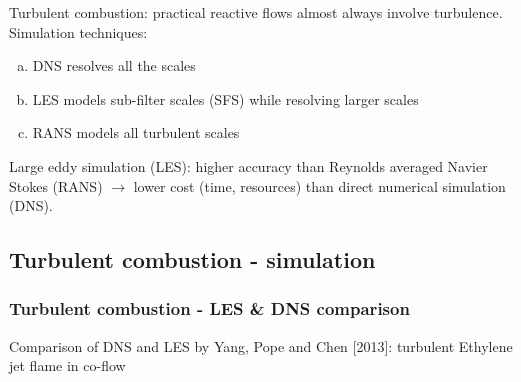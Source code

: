 \documentclass{beamer}
\begin{document}
\begin{frame}
\vspace{10pt}
\scriptsize
Turbulent combustion: practical reactive flows almost always involve turbulence.
\newline \newline
Simulation techniques: 
\begin{enumerate}[(a)]
\item DNS resolves all the scales 
\item LES models sub-filter scales (SFS) while resolving larger scales 
\item RANS models all turbulent scales 
\end{enumerate}
Large eddy simulation (LES): higher accuracy than Reynolds averaged Navier Stokes (RANS) $\rightarrow$ lower cost (time, resources) than direct numerical simulation (DNS).


\end{frame}


\subsection[simulation]{Turbulent combustion - simulation}
\begin{frame}%
\frametitle{Turbulent combustion - LES \& DNS comparison}
\scriptsize
Comparison of DNS and LES by Yang, Pope and Chen [2013]\cite{Pope}: turbulent Ethylene jet flame in co-flow

\vspace{-15pt}
\begin{figure}
\label{fig:DNSLES}
\centering
{}
\end{figure}

\end{frame}
\end{document}
